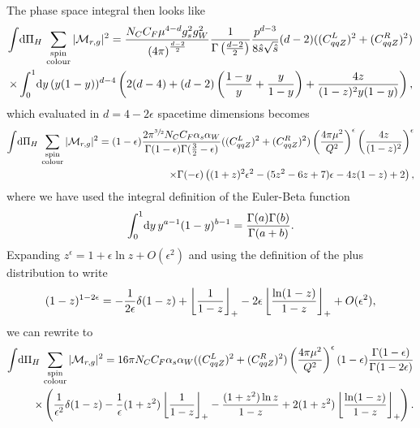 \documentclass[../main.tex]{subfiles}
\begin{document}
The phase space integral then looks like
\begin{align}
  \nonumber
  \integral{\Pi_H} \sum_{\substack{\text{spin} \\\text{colour}}} |\M_{r,g}|^2 = \frac{N_C C_F \mu^{4-d} g_s^2 g_W^2}{\pclosed{4\pi}^{\frac{d-2}{2}}} \frac{1}{\Gamma\pclosed{\frac{d-2}{2}}} \frac{p^{d-3}}{8\hat{s}\sqrt{\hat{s}}} (d-2) ((C_{qqZ}^L)^2 + (C_{qqZ}^R)^2) \\
  \times \integral[_0^1]{y} (y(1-y))^{d-4} \pclosed{2(d-4) + (d-2)\pclosed{\frac{1-y}{y} + \frac{y}{1-y}} + \frac{4z}{(1-z)^2 y(1-y)}},
\end{align}
which evaluated in \(d=4-2\epsilon\) spacetime dimensions becomes
\begin{align}
  \nonumber
  \integral{\Pi_H} \sum_{\substack{\text{spin} \\\text{colour}}} |\M_{r,g}|^2 = (1-\epsilon) \frac{2 \pi^{\sfrac{3}{2}} N_C C_F \alpha_s \alpha_W}{\Gamma(1-\epsilon) \Gamma(\frac{3}{2}-\epsilon)} ((C_{qqZ}^L)^2 + (C_{qqZ}^R)^2) \pclosed{\frac{4\pi \mu^2}{Q^2}}^{\epsilon} \pclosed{\frac{4z}{(1-z)^2}}^\epsilon \\
  \times \Gamma(-\epsilon) \pclosed{(1+z)^2 \epsilon^2 - (5z^2-6z+7)\epsilon - 4z(1-z) + 2},
\end{align}
where we have used the integral definition of the Euler-Beta function
\begin{equation}
  \integral[_0^1]{y} y^{a-1}(1-y)^{b-1} = \frac{\Gamma(a)\Gamma(b)}{\Gamma(a+b)}.
\end{equation}
Expanding \(z^{\epsilon} = 1 + \epsilon \ln z + O(\epsilon^2)\) and using the definition of the plus distribution to write
\begin{equation}
  (1-z)^{1-2\epsilon} = -\frac{1}{2\epsilon} \delta(1-z) + \plusdist{\frac{1}{1-z}} -2\epsilon \plusdist{\frac{\ln(1-z)}{1-z}} + O(\epsilon^2),
\end{equation}
we can rewrite to
\begin{align}
  \nonumber
  \integral{\Pi_H} \sum_{\substack{\text{spin} \\\text{colour}}} |\M_{r,g}|^2 = 16 \pi N_C C_F \alpha_s \alpha_W ((C_{qqZ}^L)^2 + (C_{qqZ}^R)^2) \pclosed{\frac{4\pi \mu^2}{Q^2}}^{\epsilon} (1-\epsilon) \frac{\Gamma(1-\epsilon)}{\Gamma(1-2\epsilon)} \\
  \times \pclosed{\frac{1}{\epsilon^2} \delta(1-z) - \frac{1}{\epsilon} (1+z^2)\plusdist{\frac{1}{1-z}} - \frac{(1+z^2)\ln z}{1-z} + 2(1+z^2)\plusdist{\frac{\ln(1-z)}{1-z}}}.
\end{align}
\end{document}
